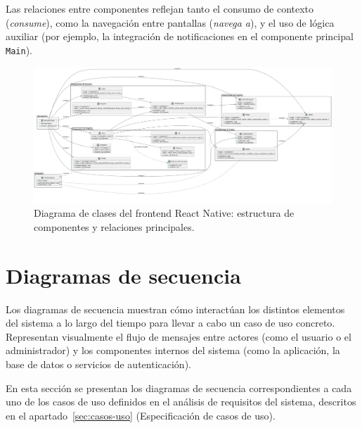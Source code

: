 Las relaciones entre componentes reflejan tanto el consumo de contexto (\textit{consume}), como la navegación entre pantallas (\textit{navega a}), y el uso de lógica auxiliar (por ejemplo, la integración de notificaciones en el componente principal \texttt{Main}).

\begin{landscape} \vfill \begin{figure}[H] \centering \includegraphics[width=1.2\paperwidth]{figs/prueba.png} \caption{Diagrama de clases del frontend React Native: estructura de componentes y relaciones principales.} \label{fig:clases-frontend} \end{figure} \vfill \end{landscape}

\section{Diagramas de secuencia}

Los diagramas de secuencia muestran cómo interactúan los distintos elementos del sistema a lo largo del tiempo para llevar a cabo un caso de uso concreto. Representan visualmente el flujo de mensajes entre actores (como el usuario o el administrador) y los componentes internos del sistema (como la aplicación, la base de datos o servicios de autenticación). 

En esta sección se presentan los diagramas de secuencia correspondientes a cada uno de los casos de uso definidos en el análisis de requisitos del sistema, descritos en el apartado~\ref{sec:casos-uso} (Especificación de casos de uso). 


